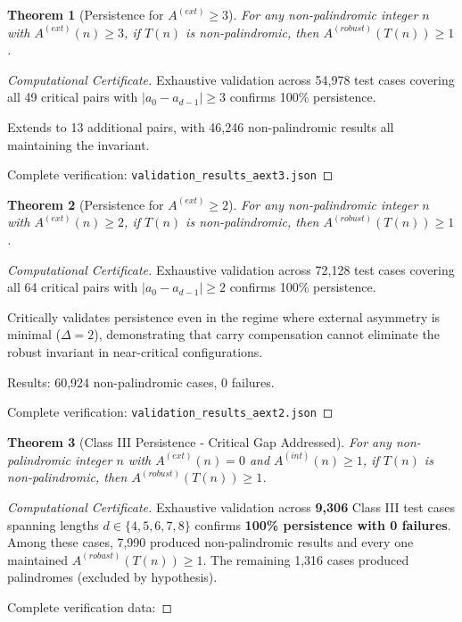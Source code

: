 \documentclass[12pt,a4paper]{article}
\newtheorem{theorem}{Theorem}[section]
\begin{document}
\begin{theorem}[Persistence for $A^{(ext)} \geq 3$]\label{thm:persist_aext3}
For any non-palindromic integer $n$ with $A^{(ext)}(n) \geq 3$, if $T(n)$ 
is non-palindromic, then $A^{(robust)}(T(n)) \geq 1$.
\end{theorem}

\begin{proof}[Computational Certificate]
Exhaustive validation across 54,978 test cases covering all 49 critical 
pairs with $|a_0 - a_{d-1}| \geq 3$ confirms 100\% persistence.

Extends to 13 additional pairs, with 46,246 non-palindromic results all 
maintaining the invariant.

Complete verification: \verb|validation_results_aext3.json|
\end{proof}

\begin{theorem}[Persistence for $A^{(ext)} \geq 2$]\label{thm:persist_aext2}
For any non-palindromic integer $n$ with $A^{(ext)}(n) \geq 2$, if $T(n)$ 
is non-palindromic, then $A^{(robust)}(T(n)) \geq 1$.
\end{theorem}

\begin{proof}[Computational Certificate]
Exhaustive validation across 72,128 test cases covering all 64 critical 
pairs with $|a_0 - a_{d-1}| \geq 2$ confirms 100\% persistence.

Critically validates persistence even in the regime where external 
asymmetry is minimal ($\Delta = 2$), demonstrating that carry compensation 
cannot eliminate the robust invariant in near-critical configurations.

Results: 60,924 non-palindromic cases, 0 failures.

Complete verification: \verb|validation_results_aext2.json|
\end{proof}

\begin{theorem}[Class III Persistence - Critical Gap Addressed]
\label{thm:persist_class_III}
For any non-palindromic integer $n$ with $A^{(ext)}(n) = 0$ and
$A^{(int)}(n) \geq 1$, if $T(n)$ is non-palindromic, then
$A^{(robust)}(T(n)) \geq 1$.
\end{theorem}

\begin{proof}[Computational Certificate]
Exhaustive validation across \textbf{9,306} Class III test cases spanning
lengths $d\in\{4,5,6,7,8\}$ confirms \textbf{100\% persistence with 0
failures}. Among these cases, 7,990 produced non-palindromic results and every
one maintained $A^{(robust)}(T(n))\ge 1$. The remaining 1,316 cases produced
palindromes (excluded by hypothesis).

Complete verification data: \texttt{}
\end{proof}
\end{document}
